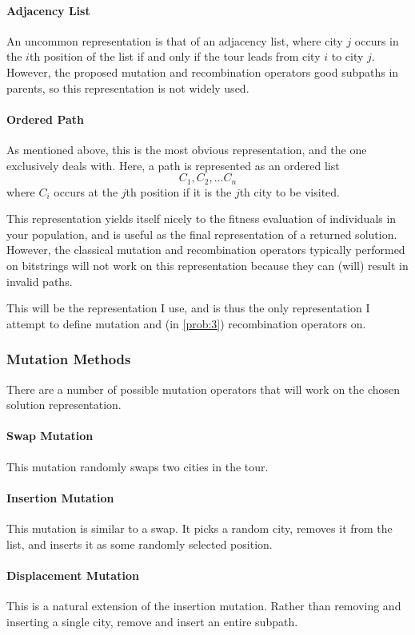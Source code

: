 \documentclass{article}
\begin{document}
\paragraph{Adjacency List}
An uncommon representation is that of an adjacency list, where city $j$ occurs in the $i$th
position of the list if and only if the tour leads from city $i$ to city $j$. However, the proposed
mutation and recombination operators good subpaths in parents, so this representation is not widely
used.

\paragraph{Ordered Path}
As mentioned above, this is the most obvious representation, and the one~\cite{tsp_ea} exclusively
deals with. Here, a path is represented as an ordered list
\[C_1, C_2, \dots C_n \]
where $C_i$ occurs at the $j$th position if it is the $j$th city to be visited.

This representation yields itself nicely to the fitness evaluation of individuals in your
population, and is useful as the final representation of a returned solution. However, the
classical mutation and recombination operators typically performed on bitstrings will not work on
this representation because they can (will) result in invalid paths.

This will be the representation I use, and is thus the only representation I attempt to define
mutation and (in \autoref{prob:3}) recombination operators on.

\subsubsection{Mutation Methods}
There are a number of possible mutation operators that will work on the chosen solution
representation.
\paragraph{Swap Mutation} This mutation randomly swaps two cities in the tour.
\paragraph{Insertion Mutation} This mutation is similar to a swap. It picks a random city, removes
it from the list, and inserts it as some randomly selected position.
\paragraph{Displacement Mutation} This is a natural extension of the insertion mutation. Rather
than removing and inserting a single city, remove and insert an entire subpath.
\end{document}
